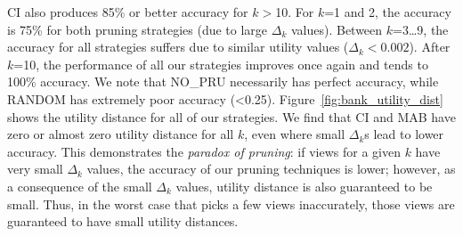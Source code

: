 CI also produces 85\% or better accuracy for $k$$>$10.
For $k$=1 and 2, the accuracy is 75\% for both pruning strategies (due to large 
$\Delta_k$ values).
Between $k$=3\ldots9, the accuracy for all strategies suffers due to similar utility values 
($\Delta_k < 0.002$).
After $k$=10, the performance of all our strategies improves once again and tends to 100\% accuracy.
We note that NO\_PRU necessarily has perfect accuracy, while RANDOM has extremely poor accuracy (<0.25).
Figure~\ref{fig:bank_utility_dist} shows the utility distance for
all of our strategies.
We find that CI and MAB have zero or almost zero utility distance for all $k$, even where small $\Delta_k$s
lead to lower accuracy.
This demonstrates the {\it paradox of pruning}: if views for a given $k$ have very small $\Delta_k$
values, the accuracy of our pruning techniques is lower; however, as a consequence of the small
$\Delta_k$ values, utility distance is also guaranteed to be small. 
Thus, in the worst case that \SeeDB picks a few views inaccurately, those views are guaranteed 
to have small utility distances.





